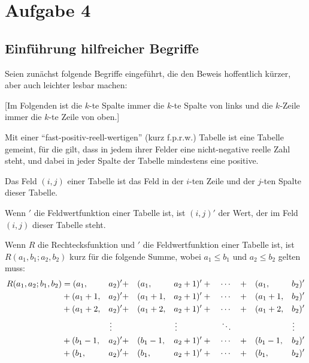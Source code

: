 \section{Aufgabe 4}

\subsection*{Einführung hilfreicher Begriffe}

Seien zunächst folgende Begriffe eingeführt, die den Beweis hoffentlich kürzer, aber auch leichter lesbar machen:

[Im Folgenden ist die $k$-te Spalte immer die $k$-te Spalte von links und die $k$-Zeile immer die $k$-te Zeile von oben.]
\begin{definition}
    Mit einer "`fast-positiv-reell-wertigen"' (kurz f.p.r.w.) Tabelle ist eine Tabelle gemeint, für die gilt, dass 
    in jedem ihrer Felder eine nicht-negative reelle Zahl steht, und dabei in jeder Spalte der Tabelle mindestens 
    eine positive.
\end{definition}
\begin{definition}
    Das Feld $(i, j)$ einer Tabelle ist das Feld in der $i$-ten Zeile und der $j$-ten Spalte dieser Tabelle.
\end{definition}
\begin{definition}
    Wenn $'$ die Feldwertfunktion einer Tabelle ist, ist $(i, j)'$ der Wert, der im Feld $(i, j)$ dieser Tabelle 
    steht.
\end{definition}
\begin{definition}\label{rfunktion}
    Wenn $R$ die Rechtecksfunktion und $'$ die Feldwertfunktion einer Tabelle ist, ist $R(a_1, b_1; a_2, b_2)$ kurz 
    für die folgende Summe, wobei $a_1\leq b_1$ und $a_2\leq b_2$ gelten muss:
    \begin{alignat*}{6}
        R(a_1, a_2; b_1, b_2) &= (a_1, &&a_2)' + &&(a_1, &&a_2+1)' + \quad \cdots \quad + &&(a_1, &&b_2)'\\
        &+(a_1+1, &&a_2)' + &&(a_1+1, &&a_2+1)' +\quad \cdots \quad + &&(a_1+1, &&b_2)'\\
        &+(a_1+2, &&a_2)' + &&(a_1+2, &&a_2+1)' +\quad \cdots \quad + &&(a_1+2, &&b_2)'\\
        & &&\vdotswithin{a} && &&\vdotswithin{a}\quad\quad\quad\quad\quad \ddots && &&\vdotswithin{b} \\
        &+(b_1-1, &&a_2)' + &&(b_1-1, &&a_2+1)' +\quad \cdots \quad + &&(b_1-1, &&b_2)'\\
        &+(b_1, &&a_2)' + &&(b_1, &&a_2+1)' + \quad \cdots \quad + &&(b_1, &&b_2)'
    \end{alignat*}    
\end{definition}
